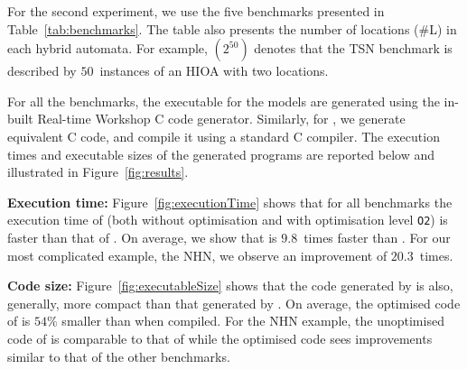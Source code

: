 For the second experiment, we use the five benchmarks
presented in Table~\ref{tab:benchmarks}.  The table also presents the
number of locations (\#L) in each hybrid automata.  For example,
$(2^{50})$ denotes that the \acf{TSN} benchmark is described by $50$~instances 
of an \ac{HIOA} with two locations.

For all the benchmarks, the executable for the \simulink models are
generated using the in-built Real-time
Workshop\textsuperscript{\textregistered} C code generator.  Similarly,
for \ourTool, we generate equivalent C code, and compile it using a
standard C compiler.
The execution times and executable sizes of the generated programs are reported 
below and illustrated in Figure~\ref{fig:results}.

\textbf{Execution time:} Figure~\ref{fig:executionTime} shows that for
all benchmarks the execution time of \ourTool (both without optimisation
and with optimisation level \texttt{O2}) is faster than that of
\simulink.  On average, we show that \ourTool is $9.8$~times faster than
\simulink.
For our most complicated example, the \ac{NHN}, we observe an improvement of 
$20.3$~times.

\textbf{Code size:} Figure~\ref{fig:executableSize} shows that the code
generated by \ourTool is also, generally, more compact than that
generated by \simulink.  On average, the optimised code of \ourTool is
$54\%$ smaller than \simulink when compiled.
For the \ac{NHN} example, the unoptimised code of \ourTool is comparable to 
that of \simulink while the optimised code sees improvements similar to that of 
the other benchmarks.





